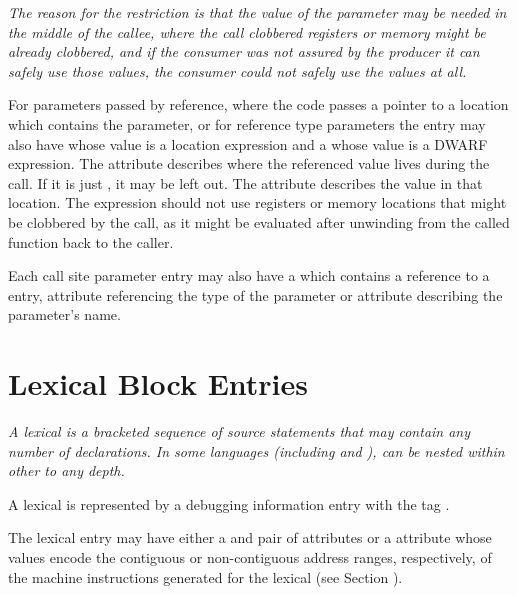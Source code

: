 \textit{The reason for the restriction is that the value of the parameter may be
needed in the middle of the callee, where the call clobbered registers or
memory might be already clobbered, and if the consumer was not assured by
the producer it can safely use those values, the consumer could not safely
use the values at all.}

For parameters passed by reference, where the code passes a pointer to
a location which contains the parameter, or for reference type parameters
the \DWTAGcallsiteparameter{} entry may also have 
\DWATcalldatalocationNAME{}
whose value is a location expression and a
\DWATcalldatavalueNAME{}
whose value is a DWARF expression.  The \DWATcalldatalocationNAME{} attribute 
describes where the referenced value lives during the call.  If it is just 
\DWOPpushobjectaddress{}, it may be left out.  The 
\DWATcalldatavalueNAME{} attribute describes the value in that location. 
The expression should not use registers or memory
locations that might be clobbered by the call, as it might be evaluated after
unwinding from the called function back to the caller.

Each call site parameter entry may also have a 
\DWATcallparameter{}
which contains a reference to a \DWTAGformalparameter{} entry,
\DWATtype{} attribute referencing the type of the parameter or \DWATname{}
attribute describing the parameter's name.


\section{Lexical Block Entries}
\label{chap:lexicalblockentries}

\textit{A 
lexical  
is 
a bracketed sequence of source statements
that may contain any number of declarations. In some languages
(including  and ),
 can be nested within other
 to any depth.}

A lexical  is represented by a debugging information
entry with the 
tag \DWTAGlexicalblockTARG.

The lexical  
entry may have 
either a \DWATlowpc{} and
\DWAThighpc{} pair of 
attributes 
or 
a 
\DWATranges{} attribute
whose values encode the contiguous or non-contiguous address
ranges, respectively, of the machine instructions generated
for the lexical  
(see Section ).

